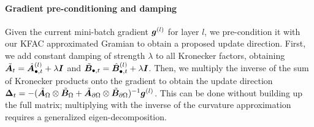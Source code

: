 \paragraph{Gradient pre-conditioning and damping}
Given the current mini-batch gradient ${\bm{g}}^{(l)}$ for layer $l$, we pre-condition it with our KFAC approximated Gramian to obtain a proposed update direction.
First, we add constant damping of strength $\lambda$ to all Kronecker factors, obtaining $\tilde{{\bm{A}}}_t = \hat{{\bm{A}}}^{(l)}_{\bullet,t} + \lambda {\bm{I}}$ and $\tilde{{\bm{B}}}_{\bullet,t} = \hat{{\bm{B}}}^{(l)}_{\bullet,t} + \lambda {\bm{I}}$.
Then, we multiply the inverse of the sum of Kronecker products onto the gradient to obtain the update direction ${\bm{\Delta}}_t = -(\tilde{{\bm{A}}}_{\Omega} \otimes \tilde{{\bm{B}}}_{\Omega} + \tilde{{\bm{A}}}_{\partial\Omega} \otimes \tilde{{\bm{B}}}_{\partial\Omega})^{-1} {\bm{g}}^{(l)}$.
This can be done without building up the full matrix; multiplying with the inverse of the curvature approximation requires a generalized eigen-decomposition.

